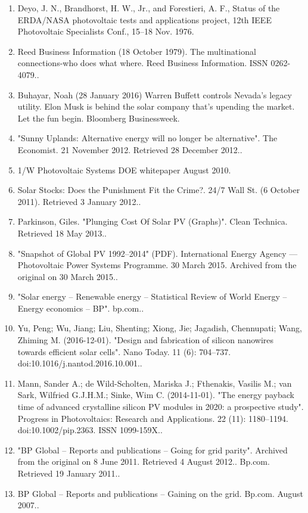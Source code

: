 \begin{enumerate}
\item Deyo, J. N., Brandhorst, H. W., Jr., and Forestieri, A. F., Status of the ERDA/NASA photovoltaic tests and applications project, 12th IEEE Photovoltaic Specialists Conf., 15–18 Nov. 1976.
\item Reed Business Information (18 October 1979). The multinational connections-who does what where. Reed Business Information. ISSN 0262-4079..
\item Buhayar, Noah (28 January 2016) Warren Buffett controls Nevada’s legacy utility. Elon Musk is behind the solar company that’s upending the market. Let the fun begin. Bloomberg Businessweek.
\item "Sunny Uplands: Alternative energy will no longer be alternative". The Economist. 21 November 2012. Retrieved 28 December 2012..
\item 1/W Photovoltaic Systems DOE whitepaper August 2010.
\item Solar Stocks: Does the Punishment Fit the Crime?. 24/7 Wall St. (6 October 2011). Retrieved 3 January 2012..
\item Parkinson, Giles. "Plunging Cost Of Solar PV (Graphs)". Clean Technica. Retrieved 18 May 2013..
\item "Snapshot of Global PV 1992–2014" (PDF). International Energy Agency — Photovoltaic Power Systems Programme. 30 March 2015. Archived from the original on 30 March 2015..
\item "Solar energy – Renewable energy – Statistical Review of World Energy – Energy economics – BP". bp.com..
\item Yu, Peng; Wu, Jiang; Liu, Shenting; Xiong, Jie; Jagadish, Chennupati; Wang, Zhiming M. (2016-12-01). "Design and fabrication of silicon nanowires towards efficient solar cells". Nano Today. 11 (6): 704–737. doi:10.1016/j.nantod.2016.10.001..
\item Mann, Sander A.; de Wild-Scholten, Mariska J.; Fthenakis, Vasilis M.; van Sark, Wilfried G.J.H.M.; Sinke, Wim C. (2014-11-01). "The energy payback time of advanced crystalline silicon PV modules in 2020: a prospective study". Progress in Photovoltaics: Research and Applications. 22 (11): 1180–1194. doi:10.1002/pip.2363. ISSN 1099-159X..
\item "BP Global – Reports and publications – Going for grid parity". Archived from the original on 8 June 2011. Retrieved 4 August 2012.. Bp.com. Retrieved 19 January 2011..
\item BP Global – Reports and publications – Gaining on the grid. Bp.com. August 2007..

\end{enumerate}
